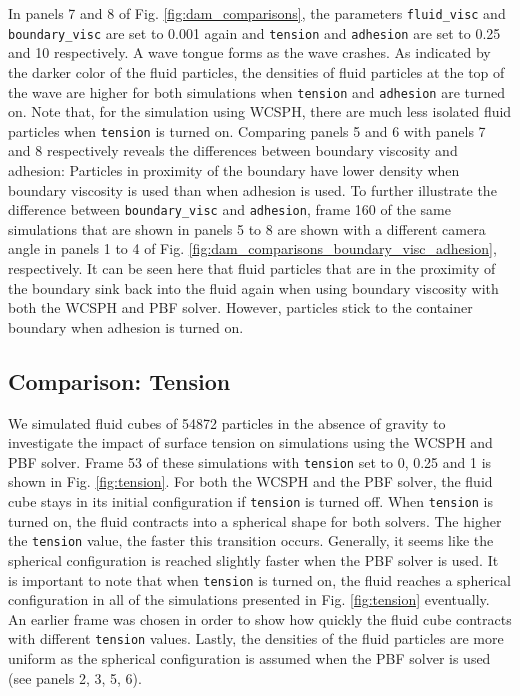 \documentclass[11pt, letterpaper, twocolumn]{article}
\begin{document}
In panels 7 and 8 of Fig. \ref{fig:dam_comparisons}, the parameters \texttt{fluid\_visc} and \texttt{boundary\_visc} are set to 0.001 again and \texttt{tension} and \texttt{adhesion} are set to 0.25 and 10 respectively. A wave tongue forms as the wave crashes. As indicated by the darker color of the fluid particles,  the densities of fluid particles at the top of the wave are higher for both simulations  when \texttt{tension} and \texttt{adhesion} are turned on.
Note that, for the simulation using WCSPH, there are much less isolated fluid particles when \texttt{tension} is turned on. Comparing panels 5 and 6 with panels 7 and 8 respectively reveals the 
differences between boundary viscosity and adhesion: Particles in proximity of the boundary have lower density when boundary viscosity is used than when adhesion is used.
To further illustrate the difference between \texttt{boundary\_visc} and \texttt{adhesion}, frame 160 of the same simulations that are shown in panels 5 to 8 are shown with a
different camera angle in panels 1 to 4 of Fig. \ref{fig:dam_comparisons_boundary_visc_adhesion}, respectively. It can be seen here that fluid particles that are in the proximity of the boundary sink back into the fluid again when using boundary viscosity with both the WCSPH and PBF solver. However, particles stick to the container boundary when adhesion is turned on. 

\subsection{Comparison: Tension}
\label{subsec:comparison_tension}

We simulated fluid cubes of 54872 particles in the absence of gravity to investigate the impact of surface tension on simulations using the WCSPH and PBF solver.
Frame 53 of these simulations with \texttt{tension} set to 0, 0.25 and 1 is shown in Fig. \ref{fig:tension}. For both the WCSPH and the PBF solver, the fluid cube stays in its initial configuration
if \texttt{tension} is turned off. When \texttt{tension} is turned on, the fluid contracts into a spherical shape for both solvers. The higher the \texttt{tension} value, the faster this transition occurs. Generally, it seems like the spherical configuration is reached slightly faster when the PBF solver is used. It is important to note that when 
\texttt{tension} is turned on, the fluid reaches a spherical configuration in all of the simulations presented in Fig. \ref{fig:tension} eventually. An earlier frame was chosen in order to show how quickly the fluid cube contracts with different \texttt{tension} values. Lastly, the densities of the fluid particles are more uniform as the spherical configuration
is assumed when the PBF solver is used (see panels 2, 3, 5, 6).
\end{document}
